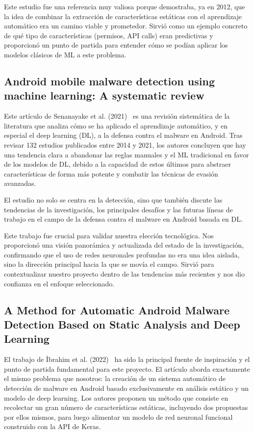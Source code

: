 Este estudio fue una referencia muy valiosa porque demostraba, ya en 2012, que la idea de combinar la extracción de características estáticas con el aprendizaje automático era un camino viable y prometedor. Sirvió como un ejemplo concreto de qué tipo de características (permisos, API calls) eran predictivas y proporcionó un punto de partida para entender cómo se podían aplicar los modelos clásicos de ML a este problema.

\subsection{Android mobile malware detection using machine learning: A systematic review}

Este artículo de Senanayake et al. (2021)~\cite{senanayake2021android} es una revisión sistemática de la literatura que analiza cómo se ha aplicado el aprendizaje automático, y en especial el deep learning (DL), a la defensa contra el malware en Android. Tras revisar 132 estudios publicados entre 2014 y 2021, los autores concluyen que hay una tendencia clara a abandonar las reglas manuales y el ML tradicional en favor de los modelos de DL, debido a la capacidad de estos últimos para abstraer características de forma más potente y combatir las técnicas de evasión avanzadas.

El estudio no solo se centra en la detección, sino que también discute las tendencias de la investigación, los principales desafíos y las futuras líneas de trabajo en el campo de la defensa contra el malware en Android basada en DL.

Este trabajo fue crucial para validar nuestra elección tecnológica. Nos proporcionó una visión panorámica y actualizada del estado de la investigación, confirmando que el uso de redes neuronales profundas no era una idea aislada, sino la dirección principal hacia la que se movía el campo. Sirvió para contextualizar nuestro proyecto dentro de las tendencias más recientes y nos dio confianza en el enfoque seleccionado.

\subsection{A Method for Automatic Android Malware Detection Based on Static Analysis and Deep Learning}

El trabajo de İbrahim et al. (2022)~\cite{9936621} ha sido la principal fuente de inspiración y el punto de partida fundamental para este proyecto. El artículo aborda exactamente el mismo problema que nosotros: la creación de un sistema automático de detección de malware en Android basado exclusivamente en análisis estático y un modelo de deep learning. Los autores proponen un método que consiste en recolectar un gran número de características estáticas, incluyendo dos propuestas por ellos mismos, para luego alimentar un modelo de red neuronal funcional construido con la API de Keras.

